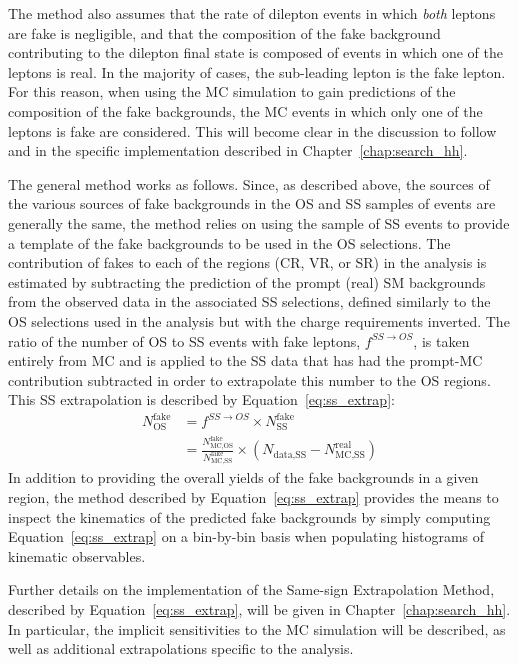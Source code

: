 The method also assumes that the rate of dilepton events in which \textit{both} leptons
are fake is negligible, and that the composition of the fake background contributing to
the dilepton final state is composed of events in which one of the leptons is real.
In the majority of cases, the sub-leading lepton is the fake lepton.
For this reason, when using the MC simulation to gain predictions of the composition of
the fake backgrounds, the MC events in which only one of the leptons is fake are considered.
This will become clear in the discussion to follow and in the specific implementation described
in Chapter~\ref{chap:search_hh}.


The general method works as follows.
Since, as described above, the sources of the various sources of fake backgrounds in the OS and SS samples of events
are generally the same, the method relies on using the sample of SS events to provide a template of the fake backgrounds
to be used in the OS selections.
The contribution of fakes to each of the regions (CR, VR, or SR) in the analysis is estimated
by subtracting the prediction of the prompt (real) SM backgrounds from the observed data
in the associated SS selections, defined similarly to the OS selections used in the analysis but with the
charge requirements inverted.
The ratio of the number of OS to SS events with fake leptons, $f^{SS \rightarrow OS}$,
is taken entirely from MC and is applied to the SS data that has had the prompt-MC contribution
subtracted in order to extrapolate this number to the OS regions.
This SS extrapolation is described by Equation~\ref{eq:ss_extrap}:
\begin{align}
    N_{\text{OS}}^{\text{fake}} &= f^{SS \rightarrow OS} \times N_{\text{SS}}^{\text{fake}} \nonumber \\
        &= \frac{ N_{\text{MC,OS}}^{\text{fake}} }{ N_{\text{MC,SS}}^{\text{fake}} } \times ( N_{\text{data,SS}} - N_{\text{MC,SS}}^{\text{real}} )
        \label{eq:ss_extrap}
\end{align}
In addition to providing the overall yields of the fake backgrounds in a given region,
the method described by Equation~\ref{eq:ss_extrap} provides the means to
inspect the kinematics of the predicted fake backgrounds by simply computing
Equation~\ref{eq:ss_extrap} on a bin-by-bin basis when populating histograms
of kinematic observables.

Further details on the implementation of the Same-sign Extrapolation Method,
described by Equation~\ref{eq:ss_extrap}, will be given in Chapter~\ref{chap:search_hh}.
In particular, the implicit sensitivities to the MC simulation will be described,
as well as additional extrapolations specific to the analysis.
